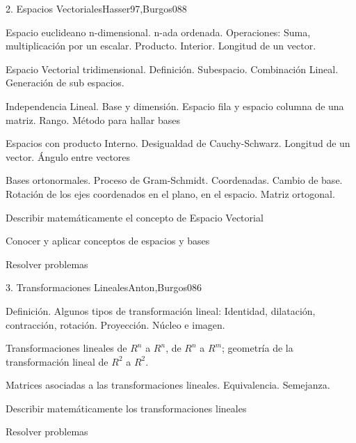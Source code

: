 \begin{syllabus}
\begin{unit}{2. Espacios Vectoriales}{Hasser97,Burgos08}{8}
\begin{topics}
	\item Espacio euclideano n-dimensional. n-ada ordenada. Operaciones: Suma, multiplicación por un escalar. Producto. Interior. Longitud de un vector.
	\item Espacio Vectorial tridimensional. Definición. Subespacio. Combinación Lineal. Generación de sub espacios.
      \item Independencia Lineal. Base y dimensión. Espacio fila y espacio columna de una matriz. Rango. Método para hallar bases
      \item Espacios con producto Interno. Desigualdad de Cauchy-Schwarz. Longitud de un vector. Ángulo entre vectores
      \item Bases ortonormales. Proceso de Gram-Schmidt. Coordenadas. Cambio de base. Rotación de los ejes coordenados en el plano, en el espacio. Matriz ortogonal.
    \end{topics}
   \begin{unitgoals}
      \item Describir matemáticamente el concepto de Espacio Vectorial
      \item Conocer y aplicar conceptos de espacios y bases
	\item Resolver problemas
   \end{unitgoals}
\end{unit}

\begin{unit}{3. Transformaciones Lineales}{Anton,Burgos08}{6}
\begin{topics}
      \item Definición. Algunos tipos de transformación lineal: Identidad, dilatación, contracción, rotación. Proyección. Núcleo e imagen.
      \item Transformaciones lineales de $R^n$ a $R^n$, de $R^n$ a $R^m$; geometría de la transformación lineal de $R^2$ a $R^2$.
      \item Matrices asociadas a las transformaciones lineales. Equivalencia. Semejanza.
\end{topics}

   \begin{unitgoals}
      \item Describir matemáticamente los transformaciones lineales
	\item Resolver problemas
   \end{unitgoals}
\end{unit}


\end{syllabus}
